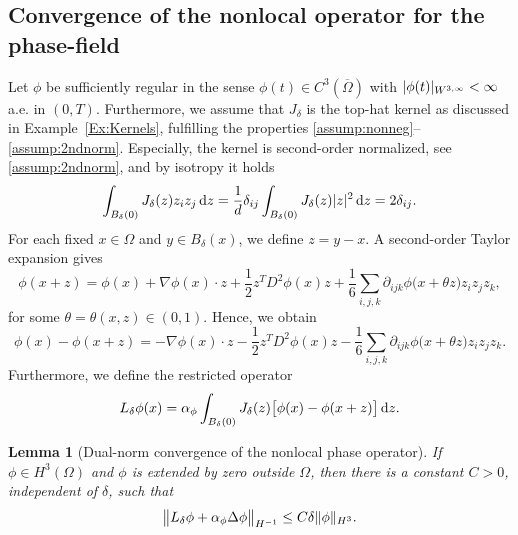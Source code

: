 \documentclass[]{article}
\newtheorem{lemma}{Lemma}[section]
\newcommand{\R}{\mathbb{R}}
\newcommand{\dz}{\,\textup{d}z}
\DeclarePairedDelimiter{\abs}{\lvert}{\rvert}
\DeclarePairedDelimiter{\norm}{\lVert}{\rVert}
\begin{document}
\subsection{Convergence of the nonlocal operator for the phase-field}
\label{sec:convergence_nonlocal_operator}
Let $\phi$ be sufficiently regular in the sense $\phi(t)\in C^3(\overline\Omega)$ with
$\abs{\phi(t)}_{W^{3,\infty}} < \infty$ a.e. in $(0,T)$.
Furthermore, we assume that $J_\delta$ is the top-hat kernel as discussed in Example~\ref{Ex:Kernels}, fulfilling the properties \eqref{assump:nonneg}--\eqref{assump:2ndnorm}.
Especially, the kernel is second-order normalized, see \eqref{assump:2ndnorm}, and by isotropy it holds
\[
\int_{B_{\delta}(0)} J_{\delta}(z)z_iz_j\dz
= \frac{1}{d}\delta_{ij}\int_{B_{\delta}(0)}J_{\delta}(z)\lvert z\rvert^2\dz
= 2\delta_{ij}.
\]
For each fixed $x\in\Omega$ and $y\in B_{\delta}(x)$, we define $z = y-x$.  A second-order Taylor expansion gives
\[
\phi(x+z)
= \phi(x)
+ \nabla\phi(x)\cdot z
+ \frac12z^TD^2\phi(x)z
+ \frac{1}{6}\sum_{i,j,k} \partial_{i j k}\phi\bigl(x+\theta z\bigr)z_iz_jz_k,
\]
for some $\theta=\theta(x,z)\in(0,1)$.  Hence, we obtain
\[
\phi(x) - \phi(x+z)
= -\nabla\phi(x)\cdot z
- \frac12z^TD^2\phi(x)z
- \frac{1}{6}\sum_{i,j,k} \partial_{i j k}\phi\bigl(x+\theta z\bigr)z_iz_jz_k.
\]
Furthermore, we define the restricted operator
\[
L_\delta\phi(x)=\alpha_\phi\int_{B_\delta(0)}J_\delta(z)\bigl[\phi(x)-\phi(x+z)\bigr]\dz.
\]
\begin{lemma}[Dual-norm convergence of the nonlocal phase operator]\label{lem:dual_norm}
	If $\phi\in H^3(\Omega)$ and $\phi$ is extended by zero outside $\Omega$, then there is a constant $C>0$, independent of $\delta$, such that
	\[
	\bigl\|L_\delta\phi + \alpha_\phi\Delta\phi\bigr\|_{H^{-1}}
	\le C\delta\norm{\phi}_{H^3}.
	\]
\end{lemma}
\end{document}

